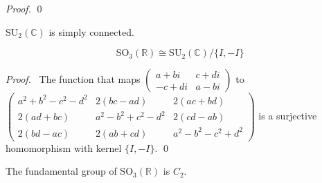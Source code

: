 \begin{proof}
\pf
{}
\qed
\end{proof}

\begin{cor}
$\mathrm{SU}_2(\mathbb{C})$ is simply connected.
\end{cor}


\begin{cor}
\[ \mathrm{SO}_3(\mathbb{R}) \cong \mathrm{SU}_2(\mathbb{C}) / \{ I, -I \} \]
\end{cor}

\begin{proof}
\pf\ The function that maps $\left( \begin{array}{cc}
a + b i & c + d i \\
-c + di & a - bi
\end{array} \right)$ to $\left( \begin{array}{ccc}
a^2 + b^2 - c^2 - d^2 & 2(bc - ad) & 2(ac + bd) \\
2(ad + bc) & a^2 - b^2 + c^2 - d^2 & 2(cd - ab) \\
2(bd - ac) & 2(ab + cd) & a^2 - b^2 - c^2 + d^2
\end{array} \right)$ is a surjective homomorphism with kernel $\{ I, -I \}$. \qed
\end{proof}

\begin{cor}
The fundamental group of $\mathrm{SO}_3(\mathbb{R})$ is $C_2$.
\end{cor}

